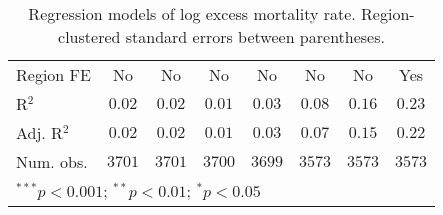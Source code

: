 \begin{table}[h!]
\begin{center}
\begin{tabular}{l c c c c c c c}
\hline
Region FE      & No           & No           & No           & No           & No            & No            & Yes           \\
R$^2$          & $0.02$       & $0.02$       & $0.01$       & $0.03$       & $0.08$        & $0.16$        & $0.23$        \\
Adj. R$^2$     & $0.02$       & $0.02$       & $0.01$       & $0.03$       & $0.07$        & $0.15$        & $0.22$        \\
Num. obs.      & $3701$       & $3701$       & $3700$       & $3699$       & $3573$        & $3573$        & $3573$        \\
\hline
\multicolumn{8}{l}{\scriptsize{$^{***}p<0.001$; $^{**}p<0.01$; $^{*}p<0.05$}}
\end{tabular}
\caption{Regression models of log excess mortality rate. Region-clustered standard errors between parentheses.}
\label{tab:basemodels}
\end{center}
\end{table}
